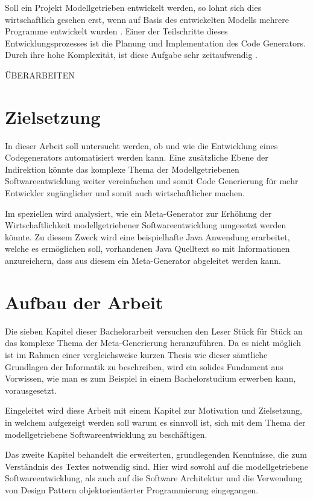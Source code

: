 \documentclass[12pt,oneside,a4paper,parskip]{scrbook}
\begin{document}
Soll ein Projekt Modellgetrieben entwickelt werden, so lohnt sich dies wirtschaftlich gesehen erst, wenn auf Basis des entwickelten Modells mehrere Programme entwickelt wurden \cite{}. Einer der Teilschritte dieses Entwicklungsprozesses ist die Planung und Implementation des Code Generators. Durch ihre hohe Komplexität, ist diese Aufgabe sehr zeitaufwendig \cite{}.

ÜBERARBEITEN
\section{Zielsetzung}

In dieser Arbeit soll untersucht werden, ob und wie die Entwicklung eines Codegenerators automatisiert werden kann. Eine zusätzliche Ebene der Indirektion könnte das komplexe Thema der Modellgetriebenen Softwareentwicklung weiter vereinfachen und somit Code Generierung für mehr Entwickler zugänglicher und somit auch wirtschaftlicher machen.

Im speziellen wird analysiert, wie ein Meta-Generator zur Erhöhung der Wirtschaftlichkeit modellgetriebener Softwareentwicklung umgesetzt werden könnte. Zu diesem Zweck wird eine beispielhafte Java Anwendung erarbeitet, welche es ermöglichen soll, vorhandenen Java Quelltext so mit Informationen anzureichern, dass aus diesem ein Meta-Generator abgeleitet werden kann.

\section{Aufbau der Arbeit}

Die sieben Kapitel dieser Bachelorarbeit versuchen den Leser Stück für Stück an das komplexe Thema der Meta-Generierung heranzuführen. Da es nicht möglich ist im Rahmen einer vergleichsweise kurzen Thesis wie dieser sämtliche Grundlagen der Informatik zu beschreiben, wird ein solides Fundament aus Vorwissen, wie man es zum Beispiel in einem Bachelorstudium erwerben kann, vorausgesetzt.

Eingeleitet wird diese Arbeit mit einem Kapitel zur Motivation und Zielsetzung, in welchem aufgezeigt werden soll warum es sinnvoll ist, sich mit dem Thema der modellgetriebene Softwareentwicklung zu beschäftigen. 

Das zweite Kapitel behandelt die erweiterten, grundlegenden Kenntnisse, die zum Verständnis des Textes notwendig sind. Hier wird sowohl auf die modellgetriebene Softwareentwicklung, als auch auf die Software Architektur und die Verwendung von Design Pattern objektorientierter Programmierung eingegangen.
\end{document}

